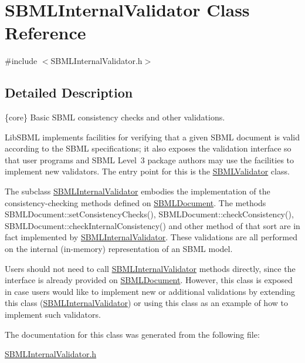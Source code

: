 \hypertarget{class_s_b_m_l_internal_validator}{}\section{S\+B\+M\+L\+Internal\+Validator Class Reference}
\label{class_s_b_m_l_internal_validator}


{\ttfamily \#include $<$S\+B\+M\+L\+Internal\+Validator.\+h$>$}



\subsection{Detailed Description}
\{core\} Basic S\+B\+ML consistency checks and other validations.



Lib\+S\+B\+ML implements facilities for verifying that a given S\+B\+ML document is valid according to the S\+B\+ML specifications; it also exposes the validation interface so that user programs and S\+B\+ML Level~3 package authors may use the facilities to implement new validators. The entry point for this is the \hyperlink{class_s_b_m_l_validator}{S\+B\+M\+L\+Validator} class.

The subclass \hyperlink{class_s_b_m_l_internal_validator}{S\+B\+M\+L\+Internal\+Validator} embodies the implementation of the consistency-\/checking methods defined on \hyperlink{class_s_b_m_l_document}{S\+B\+M\+L\+Document}. The methods S\+B\+M\+L\+Document\+::set\+Consistency\+Checks(), S\+B\+M\+L\+Document\+::check\+Consistency(), S\+B\+M\+L\+Document\+::check\+Internal\+Consistency() and other method of that sort are in fact implemented by \hyperlink{class_s_b_m_l_internal_validator}{S\+B\+M\+L\+Internal\+Validator}. These validations are all performed on the internal (in-\/memory) representation of an S\+B\+ML model.

Users should not need to call \hyperlink{class_s_b_m_l_internal_validator}{S\+B\+M\+L\+Internal\+Validator} methods directly, since the interface is already provided on \hyperlink{class_s_b_m_l_document}{S\+B\+M\+L\+Document}. However, this class is exposed in case users would like to implement new or additional validations by extending this class (\hyperlink{class_s_b_m_l_internal_validator}{S\+B\+M\+L\+Internal\+Validator}) or using this class as an example of how to implement such validators. 

The documentation for this class was generated from the following file\+:\begin{DoxyCompactItemize}
\item 
\hyperlink{_s_b_m_l_internal_validator_8h}{S\+B\+M\+L\+Internal\+Validator.\+h}\end{DoxyCompactItemize}
